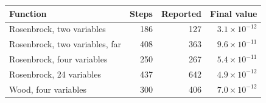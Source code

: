 \begin{tabular}{@{}lrrr@{}}
\toprule
Function & Steps & Reported & Final value \\
\midrule
Rosenbrock, two variables & 186 & 127 & $3.1\times10^{-12}$ \\
Rosenbrock, two variables, far & 408 & 363 & $9.6\times10^{-11}$ \\
Rosenbrock, four variables & 250 & 267 & $5.4\times10^{-11}$ \\
Rosenbrock, 24 variables & 437 & 642 & $4.9\times10^{-12}$ \\
Wood, four variables & 300 & 406 & $7.0\times10^{-12}$ \\
\bottomrule
\end{tabular}
